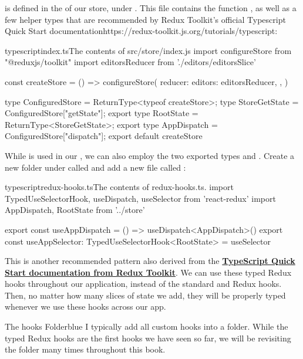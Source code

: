 \documentclass[a4paper,headinclude=on,footinclude=on,12pt,oneside]{scrbook}
\newcommand{\link}[2]{\textbf{\textcolor{monokaiPink}{\href{#2}{#1}}}}
\begin{document}
 is defined in the  of our store, under . This file contains the function , as well as a few helper types that are recommended by {Redux Toolkit's official Typescript Quick Start documentation}{https://redux-toolkit.js.org/tutorials/typescript}:

\begin{codeInput}{typescript}{index.ts}{The contents of src/store/index.js}
import { configureStore } from "@reduxjs/toolkit"
import editorsReducer from './editors/editorsSlice'

const createStore = () => configureStore({
  reducer: {
    editors: editorsReducer,
  },
})

type ConfiguredStore = ReturnType<typeof createStore>;
type StoreGetState = ConfiguredStore["getState"];
export type RootState = ReturnType<StoreGetState>;
export type AppDispatch = ConfiguredStore["dispatch"];
export default createStore
\end{codeInput}

While  is used in our , we can also employ the two exported types  and . Create a new folder under  called  and add a new file called :

\begin{codeInput}{typescript}{redux-hooks.ts}{The contents of redux-hooks.ts.}
import { TypedUseSelectorHook, useDispatch, useSelector } from 'react-redux'
import { AppDispatch, RootState } from '../store'

export const useAppDispatch = () => useDispatch<AppDispatch>()
export const useAppSelector: TypedUseSelectorHook<RootState> = useSelector
\end{codeInput}

This is another recommended pattern also derived from the \link{TypeScript Quick Start documentation from Redux Toolkit}{https://redux-toolkit.js.org/tutorials/typescript}. We can use these typed Redux hooks throughout our application, instead of the standard  and  Redux hooks. Then, no matter how many slices of state we add, they will be properly typed whenever we use these hooks across our app.

\begin{highlightBox}{The hooks Folder}{blue}{\information}
I typically add all custom hooks into a  folder. While the typed Redux hooks are the first hooks we have seen so far, we will be revisiting the  folder many times throughout this book.
\end{highlightBox}
\end{document}
